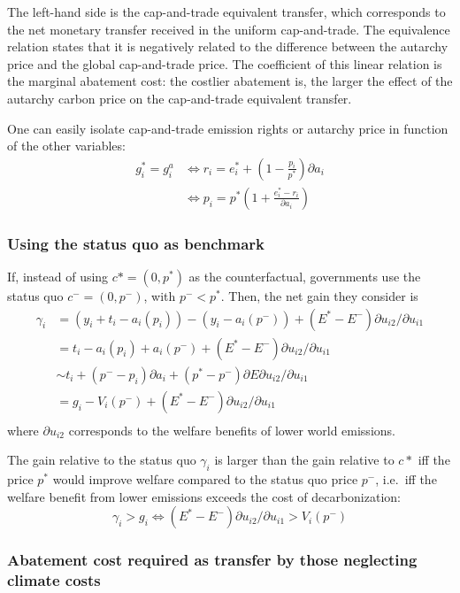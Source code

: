 \documentclass[
  letterpaper,
  DIV=11,
  numbers=noendperiod]{scrartcl}
\begin{document}
The left-hand side is the cap-and-trade equivalent transfer, which
corresponds to the net monetary transfer received in the uniform
cap-and-trade. The equivalence relation states that it is negatively
related to the difference between the autarchy price and the global
cap-and-trade price. The coefficient of this linear relation is the
marginal abatement cost: the costlier abatement is, the larger the
effect of the autarchy carbon price on the cap-and-trade equivalent
transfer.

One can easily isolate cap-and-trade emission rights or autarchy price
in function of the other variables: \[\begin{aligned}
g^*_i = g^a_i &\Leftrightarrow r_i = e_i^* + (1 - \frac{p_i}{p^*}) \partial a_i  \\
&\Leftrightarrow p_i = p^* (1 + \frac{e^*_i - r_i}{\partial a_i})
\end{aligned}\]

\subsubsection{Using the status quo as
benchmark}\label{using-the-status-quo-as-benchmark}

If, instead of using \(c*=(0, p^*)\) as the counterfactual, governments
use the status quo \(c^- = (0, p^-)\), with \(p^-<p^*\). Then, the net
gain they consider is \[\begin{aligned}
\gamma_i &= (y_i + t_i - a_i(p_i)) - (y_i - a_i(p^-)) + (E^* - E^-) \partial u_{i2}/\partial u_{i1} \\
 &= t_i -a_i(p_i) + a_i(p^-) + (E^* - E^-) \partial u_{i2}/\partial u_{i1} \\
 &\sim t_i + (p^- - p_i) \partial a_i + (p^* - p^-) \partial E \partial u_{i2}/\partial u_{i1} \\
 &= g_i - V_i(p^-) + (E^* - E^-) \partial u_{i2}/\partial u_{i1} \\
\end{aligned}\] where \(\partial u_{i2}\) corresponds to the welfare
benefits of lower world emissions.

The gain relative to the status quo \(\gamma_i\) is larger than the gain
relative to \(c*\) iff the price \(p^*\) would improve welfare compared
to the status quo price \(p^-\), i.e.~iff the welfare benefit from lower
emissions exceeds the cost of decarbonization:
\[\gamma_i > g_i \Leftrightarrow (E^* - E^-) \partial u_{i2}/\partial u_{i1} > V_i(p^-) \]

\subsubsection{Abatement cost required as transfer by those neglecting
climate
costs}\label{abatement-cost-required-as-transfer-by-those-neglecting-climate-costs}
\end{document}
